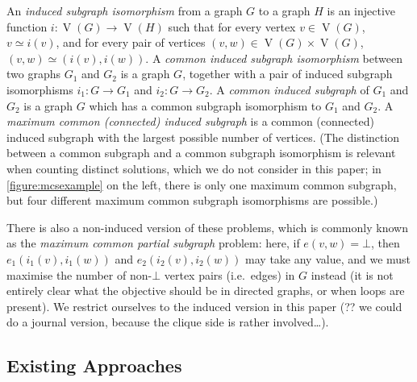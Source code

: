 \documentclass{llncs}
\begin{document}
An \emph{induced subgraph isomorphism} from a graph $G$ to a graph $H$ is an injective function $i :
\operatorname{V}(G) \rightarrow \operatorname{V}(H)$ such that for every vertex $v \in
\operatorname{V}(G)$, $v \simeq i(v)$, and for every pair of vertices $(v, w) \in
\operatorname{V}(G) \times \operatorname{V}(G)$, $(v, w) \simeq (i(v), i(w))$. A \emph{common
induced subgraph isomorphism} between two graphs $G_1$ and $G_2$ is a graph $G$, together with a
pair of induced subgraph isomorphisms $i_1 : G \rightarrow G_1$ and $i_2 : G \rightarrow G_2$. A
\emph{common induced subgraph} of $G_1$ and $G_2$ is a graph $G$ which has a common subgraph
isomorphism to $G_1$ and $G_2$. A \emph{maximum common (connected) induced subgraph} is a common
(connected) induced subgraph with the largest possible number of vertices.  (The distinction between
a common subgraph and a common subgraph isomorphism is relevant when counting distinct solutions,
which we do not consider in this paper; in \cref{figure:mcsexample} on the left, there is only one
maximum common subgraph, but four different maximum common subgraph isomorphisms are possible.)

There is also a non-induced version of these problems, which is commonly known as the \emph{maximum
common partial subgraph} problem: here, if $e(v, w) = \bot$, then $e_1(i_1(v), i_1(w))$ and
$e_2(i_2(v), i_2(w))$ may take any value, and we must maximise the number of non-$\bot$ vertex pairs
(i.e.\ edges) in $G$ instead (it is not entirely clear what the objective should be in directed
graphs, or when loops are present). We restrict ourselves to the induced version in this paper (??
we could do a journal version, because the clique side is rather involved\ldots).

\subsection{Existing Approaches}
\end{document}
